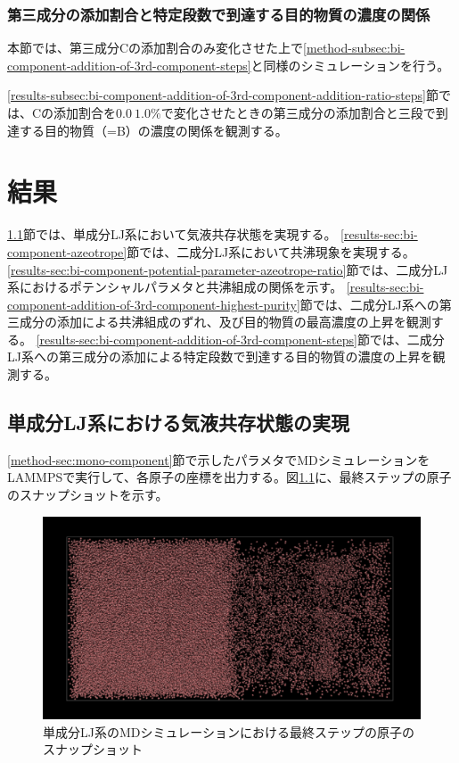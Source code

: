 \documentclass[titlepage]{jsreport}
\begin{document}
\subsection{第三成分の添加割合と特定段数で到達する目的物質の濃度の関係} \label{method-subsec:bi-component-addition-of-3rd-component-addition-ratio-steps}
本節では、第三成分Cの添加割合のみ変化させた上で\ref{method-subsec:bi-component-addition-of-3rd-component-steps}と同様のシミュレーションを行う。

\ref{results-subsec:bi-component-addition-of-3rd-component-addition-ratio-steps}節では、Cの添加割合を$0.0~1.0\%$で変化させたときの第三成分の添加割合と三段で到達する目的物質（=B）の濃度の関係を観測する。


\chapter{結果} \label{chap:results}
\ref{results-sec:mono-component}節では、単成分LJ系において気液共存状態を実現する。
\ref{results-sec:bi-component-azeotrope}節では、二成分LJ系において共沸現象を実現する。
\ref{results-sec:bi-component-potential-parameter-azeotrope-ratio}節では、二成分LJ系におけるポテンシャルパラメタと共沸組成の関係を示す。
\ref{results-sec:bi-component-addition-of-3rd-component-highest-purity}節では、二成分LJ系への第三成分の添加による共沸組成のずれ、及び目的物質の最高濃度の上昇を観測する。
\ref{results-sec:bi-component-addition-of-3rd-component-steps}節では、二成分LJ系への第三成分の添加による特定段数で到達する目的物質の濃度の上昇を観測する。

\section{単成分LJ系における気液共存状態の実現} \label{results-sec:mono-component}
\ref{method-sec:mono-component}節で示したパラメタでMDシミュレーションをLAMMPSで実行して、各原子の座標を出力する。図\ref{fig:ln78732-rn10976-ld0.629856-rd0.087808-final-vmd}に、最終ステップの原子のスナップショットを示す。
\begin{figure}[htbp]
    \begin{center}
        \includegraphics[width=14cm]{fig/ln78732-rn10976-ld0.629856-rd0.087808/ln78732-rn10976-ld0.629856-rd0.087808-final-vmd.png}
    \end{center}
    \caption{単成分LJ系のMDシミュレーションにおける最終ステップの原子のスナップショット}
    \label{fig:ln78732-rn10976-ld0.629856-rd0.087808-final-vmd}
\end{figure}
\end{document}
